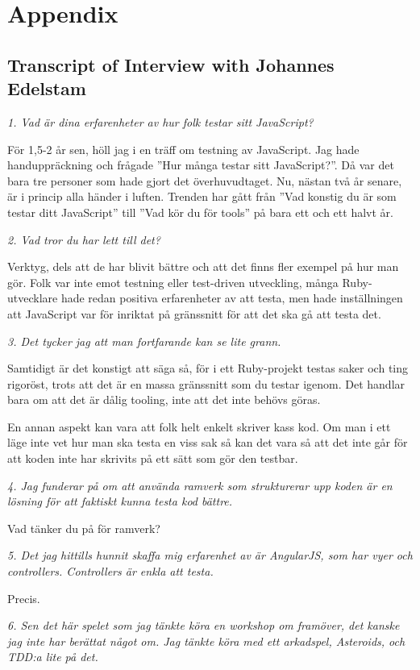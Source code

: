 \documentclass[11pt]{article}
\begin{document}
\section*{Appendix}

\subsection*{Transcript of Interview with Johannes Edelstam}

\emph{1. Vad är dina erfarenheter av hur folk testar sitt JavaScript?}

För 1,5-2 år sen, höll jag i en träff om testning av JavaScript. Jag hade handuppräckning och frågade ”Hur många testar sitt JavaScript?”. Då var det bara tre personer som hade gjort det överhuvudtaget. Nu, nästan två år senare, är i princip alla händer i luften. Trenden har gått från ”Vad konstig du är som testar ditt JavaScript” till ”Vad kör du för tools” på bara ett och ett halvt år.

\emph{2. Vad tror du har lett till det?}

Verktyg, dels att de har blivit bättre och att det finns fler exempel på hur man gör. Folk var inte emot testning eller test-driven utveckling, många Ruby-utvecklare hade redan positiva erfarenheter av att testa, men hade inställningen att JavaScript var för inriktat på gränssnitt för att det ska gå att testa det.

\emph{3. Det tycker jag att man fortfarande kan se lite grann.}

Samtidigt är det konstigt att säga så, för i ett Ruby-projekt testas saker och ting rigoröst, trots att det är en massa gränssnitt som du testar igenom. Det handlar bara om att det är dålig tooling, inte att det inte behövs göras.

En annan aspekt kan vara att folk helt enkelt skriver kass kod. Om man i ett läge inte vet hur man ska testa en viss sak så kan det vara så att det inte går för att koden inte har skrivits på ett sätt som gör den testbar.

\emph{4. Jag funderar på om att använda ramverk som strukturerar upp koden är en lösning för att faktiskt kunna testa kod bättre.}

Vad tänker du på för ramverk?

\emph{5. Det jag hittills hunnit skaffa mig erfarenhet av är AngularJS, som har vyer och controllers. Controllers är enkla att testa.}

Precis.

\emph{6. Sen det här spelet som jag tänkte köra en workshop om framöver, det kanske jag inte har berättat något om. Jag tänkte köra med ett arkadspel, Asteroids, och TDD:a lite på det.}
\end{document}
